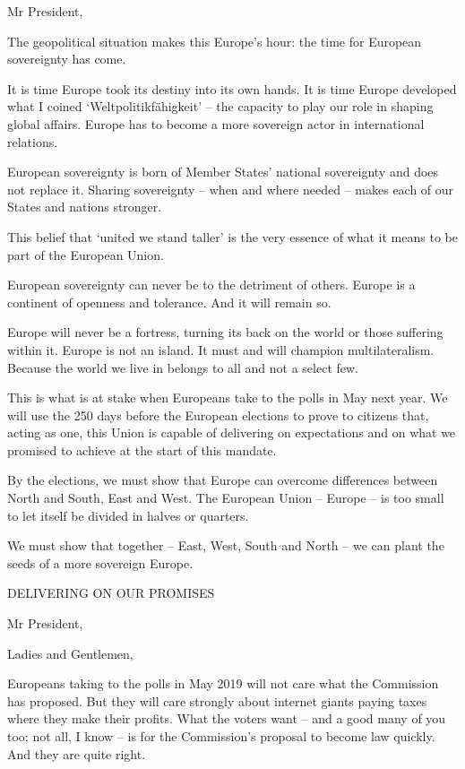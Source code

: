 \documentclass[a4paper,11pt]{article}
\begin{document}
 

Mr President,

The geopolitical situation makes this Europe's hour: the time for European sovereignty has come.

It is time Europe took its destiny into its own hands. It is time Europe developed what I coined ‘Weltpolitikfähigkeit' – the capacity to play our role in shaping global affairs. Europe has to become a more sovereign actor in international relations.

European sovereignty is born of Member States' national sovereignty and does not replace it. Sharing sovereignty – when and where needed – makes each of our States and nations stronger.

This belief that ‘united we stand taller' is the very essence of what it means to be part of the European Union.

European sovereignty can never be to the detriment of others. Europe is a continent of openness and tolerance. And it will remain so.

Europe will never be a fortress, turning its back on the world or those suffering within it. Europe is not an island. It must and will champion multilateralism. Because the world we live in belongs to all and not a select few.

This is what is at stake when Europeans take to the polls in May next year. We will use the 250 days before the European elections to prove to citizens that, acting as one, this Union is capable of delivering on expectations and on what we promised to achieve at the start of this mandate.

By the elections, we must show that Europe can overcome differences between North and South, East and West. The European Union – Europe – is too small to let itself be divided in halves or quarters.

We must show that together – East, West, South and North – we can plant the seeds of a more sovereign Europe.

  

DELIVERING ON OUR PROMISES

Mr President,

Ladies and Gentlemen,

Europeans taking to the polls in May 2019 will not care what the Commission has proposed. But they will care strongly about internet giants paying taxes where they make their profits. What the voters want – and a good many of you too; not all, I know – is for the Commission's proposal to become law quickly. And they are quite right.
\end{document}
